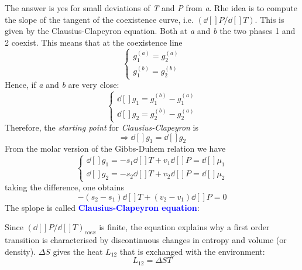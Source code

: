 \documentclass[../main/main.tex]{subfiles}
\begin{document}
The answer is yes for small deviations of \emph{T} and \emph{P} from \emph{a}. Rhe idea is to compute the slope of the tangent of the coexistence curve, i.e. \( (\dd[]{P}/\dd[]{T}  )  \). This is given by the Clausius-Clapeyron equation.
Both at \emph{a} and \emph{b} the two phases 1 and 2 coexist. This means  that at the coexistence line
\begin{equation}
  \begin{cases}
   g_1^{(a)} = g_2^{(a)}\\
   g_1^{(b)} = g_2^{(b)}
  \end{cases}
\label{eq:}
\end{equation}
Hence, if \emph{a} and \emph{b} are very close:
\begin{equation}
  \begin{cases}
  \dd[]{g_1} = g_1^{(b)} - g_1^{(a)} \\
  \dd[]{g_2} = g_2^{(b)} - g_2^{(a)}
  \end{cases}
\label{eq:}
\end{equation}
Therefore, the \emph{starting point} for \emph{Clausius-Clapeyron} is
\begin{equation}
  \Rightarrow \dd[]{g_1} =\dd[]{g_2}
  \label{eq:}
\end{equation}
From the molar version of the Gibbs-Duhem relation we have
\begin{equation}
  \begin{cases}
   \dd[]{g_1} = -s_1 \dd[]{T} + v_1 \dd[]{P} = \dd[]{\mu _1}    \\
   \dd[]{g_2} = -s_2 \dd[]{T} + v_2 \dd[]{P} = \dd[]{\mu _2}
  \end{cases}
\label{eq:}
\end{equation}
taking the difference, one obtains
\begin{equation}
  -(s_2 - s_1) \dd[]{T} + (v_2 - v_1) \dd[]{P} = 0
  \label{eq:}
\end{equation}
The splope is called \textcolor{blue}{\textbf{Clausius-Clapeyron equation}}:
\begin{remark}
Since \( (\dd[]{P}/\dd[]{T})_{coex}   \) is finite, the equation explains why a first order transition is characterised by discontinuous changes in entropy and volume (or density). \( \Delta S \)  gives the heat \( L_{12} \) that is exchanged with the environment:
\begin{equation}
  L_{12} = \Delta S T
  \label{eq:}
\end{equation}
\end{remark}
\end{document}
